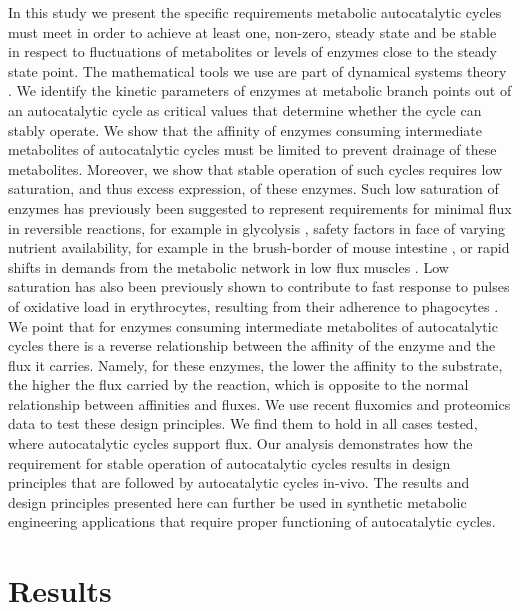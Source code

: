     In this study we present the specific requirements metabolic autocatalytic cycles must meet in order to achieve at least one, non-zero, steady state and be stable in respect to fluctuations of metabolites or levels of enzymes close to the steady state point.
    The mathematical tools we use are part of dynamical systems theory \cite{Strogatz2014-hp}.
    We identify the kinetic parameters of enzymes at metabolic branch points out of an autocatalytic cycle as critical values that determine whether the cycle can stably operate.
    We show that the affinity of enzymes consuming intermediate metabolites of autocatalytic cycles must be limited to prevent drainage of these metabolites.
    Moreover, we show that stable operation of such cycles requires low saturation, and thus excess expression, of these enzymes.
    Such low saturation of enzymes has previously been suggested to represent requirements for minimal flux in reversible reactions, for example in glycolysis \cite{Staples1997-fq,Eanes2006-gh,Flamholz2013-bb}, safety factors in face of varying nutrient availability, for example in the brush-border of mouse intestine \cite{Weiss1998-gp}, or rapid shifts in demands from the metabolic network in low flux muscles \cite{Suarez1997-jo}.
    Low saturation has also been previously shown to contribute to fast response to pulses of oxidative load in erythrocytes, resulting from their adherence to phagocytes \cite{Salvador2003-fc}.
    We point that for enzymes consuming intermediate metabolites of autocatalytic cycles there is a reverse relationship between the affinity of the enzyme and the flux it carries.
    Namely, for these enzymes, the lower the affinity to the substrate, the higher the flux carried by the reaction, which is opposite to the normal relationship between affinities and fluxes.
    We use recent fluxomics and proteomics data to test these design principles.
    We find them to hold in all cases tested, where autocatalytic cycles support flux.
    Our analysis demonstrates how the requirement for stable operation of autocatalytic cycles results in design principles that are followed by autocatalytic cycles in-vivo.
    The results and design principles presented here can further be used in synthetic metabolic engineering applications that require proper functioning of autocatalytic cycles.

\section{Results}
